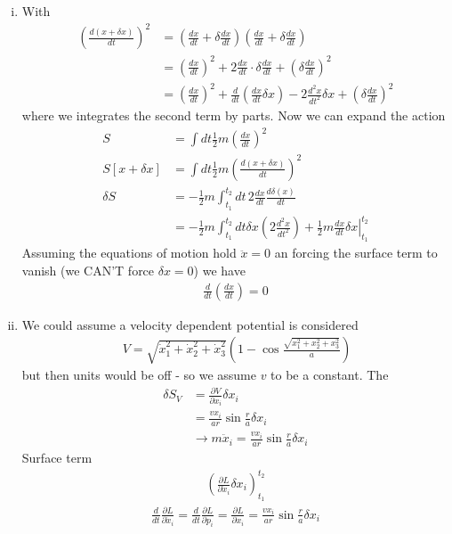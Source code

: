 \documentclass[../main.tex]{subfiles}
\begin{document}
\begin{enumerate}[(i)]
\item With
\begin{align}
\left(\frac{d(x+\delta x)}{dt}\right)^2
&=\left(\frac{dx}{dt}+\delta\frac{dx}{dt}\right)\left(\frac{dx}{dt}+\delta\frac{dx}{dt}\right)\\
&=\left(\frac{dx}{dt}\right)^2+2\frac{dx}{dt}\cdot\delta\frac{dx}{dt}+\left(\delta\frac{dx}{dt}\right)^2\\
&=\left(\frac{dx}{dt}\right)^2+\frac{d}{dt}\left(\frac{dx}{dt}\delta x\right)-2\frac{d^2x}{dt^2}\delta x+\left(\delta\frac{dx}{dt}\right)^2
\end{align}
where we integrates the second term by parts. Now we can expand the action
\begin{align}
S
&=\int dt\frac{1}{2}m\left(\frac{dx}{dt}\right)^2\\
S[x+\delta x]
&=\int dt\frac{1}{2}m\left(\frac{d(x+\delta x)}{dt}\right)^2\\
\delta S&=-\frac{1}{2}m\int_{t_1}^{t_2} dt\,2\frac{dx}{dt}\frac{d\delta(x)}{dt}\\\
&=-\frac{1}{2}m\int_{t_1}^{t_2} dt\delta x\left(2\frac{d^2x}{dt^2}\right)+\left.\frac{1}{2}m\frac{dx}{dt}\delta x\right|_{t_1}^{t_2}
\end{align}
Assuming the equations of motion hold $\ddot{x}=0$ an forcing the surface term to vanish (we CAN'T force $\delta x=0$) we have
\begin{align}
\frac{d}{dt}\left(\frac{dx}{dt}\right)=0
\end{align}

\item
We could assume a velocity dependent potential is considered 
\begin{align}\
V=\sqrt{\dot{x}_1^2+\dot{x}_2^2+\dot{x}_3^2}\left(1-\cos\frac{\sqrt{x_1^2+x_2^2+x_3^2}}{a}\right)
\end{align}
but then units would be off - so we assume $v$ to be a constant. The
\begin{align}
\delta S_V
&=\frac{\partial V}{\partial x_i}\delta x_i\\
&=\frac{vx_i}{ar}\sin\frac{r}{a}\delta x_i\\
&\rightarrow m\ddot{x}_i=\frac{vx_i}{ar}\sin\frac{r}{a}\delta x_i
\end{align} 
Surface term
\begin{align}
\left(\frac{\partial L}{\partial \dot{x}_i}\delta x_i\right)_{t_1}^{t_2}
\end{align}
\begin{align}
\frac{d}{dt}\frac{\partial L}{\partial \dot{x}_i}=
\frac{d}{dt}\frac{\partial L}{\partial p_i}=\frac{\partial L}{\partial x_i}=\frac{vx_i}{ar}\sin\frac{r}{a}\delta x_i
\end{align}
\end{enumerate}
\end{document}
